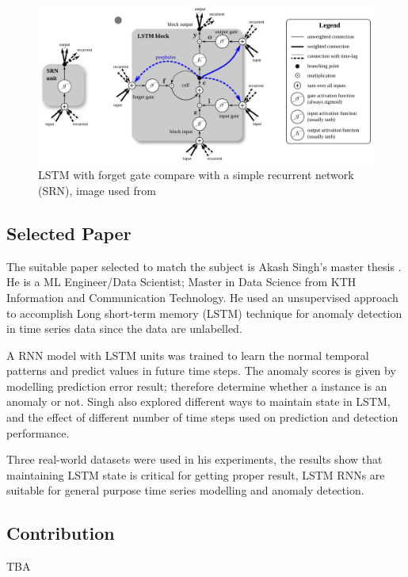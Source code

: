 \documentclass{article}
\begin{document}
\begin{figure}[htb]
	    \centering
\includegraphics[scale=0.142]{png/forgetgate.png}
    \caption{LSTM with forget gate compare with a simple recurrent network
(SRN), image used from \cite{6-forgetgategraph}}
    \label{fig:forgetgate}
\end{figure}


\subsection{Selected Paper}

The suitable paper selected to match the subject is Akash Singh's master thesis
\cite{7-lstmthisis}. He is a ML Engineer/Data Scientist; Master in Data Science
from KTH Information and Communication Technology. He used an unsupervised
approach to accomplish Long short-term memory (LSTM) technique for anomaly
detection in time series data since the data are unlabelled. 

A RNN model with LSTM units was trained to learn the normal temporal patterns
and predict values in future time steps. The anomaly scores is given by
modelling prediction error result; therefore determine whether a instance is an
anomaly or not. Singh also explored different ways to maintain state in LSTM,
and the effect of different number of time steps used on prediction and
detection performance.

Three real-world datasets were used in his experiments, the results show that
maintaining LSTM state is critical for getting proper result, LSTM RNNs are
suitable for general purpose time series modelling and anomaly detection.

\subsection{Contribution}

TBA 
\end{document}
